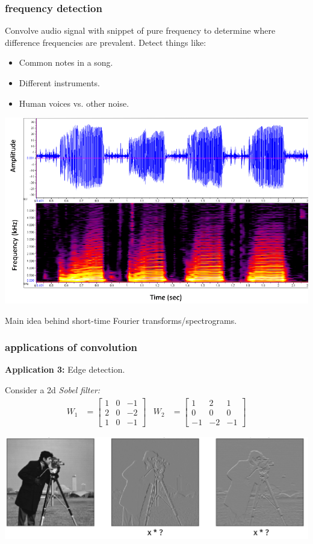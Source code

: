 \documentclass[handout,compress]{beamer}
\begin{document}
\begin{frame}
	\frametitle{frequency detection}
	\small
	Convolve audio signal with snippet of pure frequency to determine where difference frequencies are prevalent. Detect things like:
	\begin{itemize}
		\item Common notes in a song.
		\item Different instruments. 
		\item Human voices vs. other noise.
	\end{itemize}
	\begin{center}
		\includegraphics[width=.5\textwidth]{spectrogram.png}
		
		Main idea behind short-time Fourier transforms/spectrograms.
	\end{center}
\end{frame}

	\begin{frame}
	\frametitle{applications of convolution}
	\small
	\textbf{Application 3:} Edge detection.
	
	Consider a 2d \emph{Sobel filter:}
	\begin{align*}
	W_1 &= \begin{bmatrix}
	1 & 0 & -1\\
	2 & 0 & -2\\
	1 & 0 & -1
	\end{bmatrix} & 	
	W_2 &= \begin{bmatrix}
	1 & 2 & 1\\
	0 & 0 & 0\\
	-1 & -2 & -1
	\end{bmatrix}
	\end{align*}
	\begin{center}
		\includegraphics[width=\textwidth]{conv_test.png}
	\end{center}
\end{frame}
\end{document}
